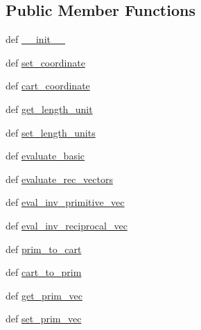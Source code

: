 \subsection*{Public Member Functions}
\begin{DoxyCompactItemize}
\item 
def \hyperlink{class_d_f_t___k_i_t_1_1core_1_1crystal__3_d_1_1crystal__3_d_a81cc974b502d653841b6c8a2e8a706e3}{\+\_\+\+\_\+init\+\_\+\+\_\+}
\item 
def \hyperlink{class_d_f_t___k_i_t_1_1core_1_1crystal__3_d_1_1crystal__3_d_a98b65667bfebb65fa63937cc00271445}{set\+\_\+coordinate}
\item 
def \hyperlink{class_d_f_t___k_i_t_1_1core_1_1crystal__3_d_1_1crystal__3_d_a73e3786edda92b516bec8efb8ab051ed}{cart\+\_\+coordinate}
\item 
def \hyperlink{class_d_f_t___k_i_t_1_1core_1_1crystal__3_d_1_1crystal__3_d_aace3722b4eb0d33ecb088dafe8288fe4}{get\+\_\+length\+\_\+unit}
\item 
def \hyperlink{class_d_f_t___k_i_t_1_1core_1_1crystal__3_d_1_1crystal__3_d_a4ba281f8df455078e7f84431d3ffdb24}{set\+\_\+length\+\_\+units}
\item 
def \hyperlink{class_d_f_t___k_i_t_1_1core_1_1crystal__3_d_1_1crystal__3_d_a7d54d2c4a1db3a4698313981eaf665f9}{evaluate\+\_\+basic}
\item 
def \hyperlink{class_d_f_t___k_i_t_1_1core_1_1crystal__3_d_1_1crystal__3_d_aed9febda8b457af38f3d67be521677da}{evaluate\+\_\+rec\+\_\+vectors}
\item 
def \hyperlink{class_d_f_t___k_i_t_1_1core_1_1crystal__3_d_1_1crystal__3_d_a46aa0b8ae019c94ee641bf35a3cd5982}{eval\+\_\+inv\+\_\+primitive\+\_\+vec}
\item 
def \hyperlink{class_d_f_t___k_i_t_1_1core_1_1crystal__3_d_1_1crystal__3_d_abac691db843d918520d382d83bc27204}{eval\+\_\+inv\+\_\+reciprocal\+\_\+vec}
\item 
def \hyperlink{class_d_f_t___k_i_t_1_1core_1_1crystal__3_d_1_1crystal__3_d_aadaa099888d5a26808c88c80f5a4d7ce}{prim\+\_\+to\+\_\+cart}
\item 
def \hyperlink{class_d_f_t___k_i_t_1_1core_1_1crystal__3_d_1_1crystal__3_d_a67a24533e75bbbb543102b71c743057f}{cart\+\_\+to\+\_\+prim}
\item 
def \hyperlink{class_d_f_t___k_i_t_1_1core_1_1crystal__3_d_1_1crystal__3_d_a29201d84a44376c8341bacda16a2d1fd}{get\+\_\+prim\+\_\+vec}
\item 
def \hyperlink{class_d_f_t___k_i_t_1_1core_1_1crystal__3_d_1_1crystal__3_d_ae0a4d3b701cbfd7284596b8ae8eb0739}{set\+\_\+prim\+\_\+vec}

\end{DoxyCompactItemize}
